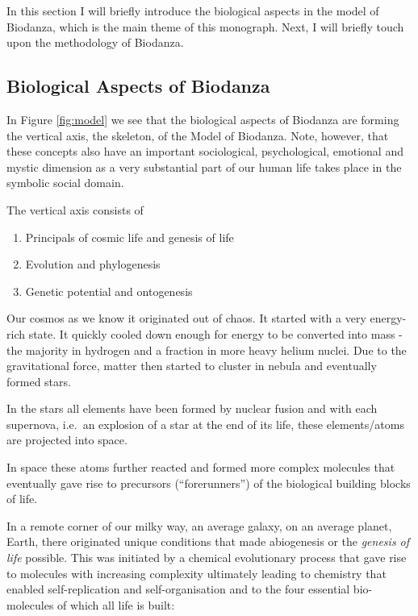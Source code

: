 \documentclass[
  11pt,
]{book}
\providecommand{\tightlist}{%
  \setlength{\itemsep}{0pt}\setlength{\parskip}{0pt}}
\begin{document}
In this section I will briefly introduce the biological aspects in the model of Biodanza, which is the main theme of this monograph. Next, I will briefly touch upon the methodology of Biodanza.

\hypertarget{biological-aspects-of-biodanza}{%
\subsection{Biological Aspects of Biodanza}\label{biological-aspects-of-biodanza}}

In Figure \ref{fig:model} we see that the biological aspects of Biodanza are forming the vertical axis, the skeleton, of the Model of Biodanza. Note, however, that these concepts also have an important sociological, psychological, emotional and mystic dimension as a very substantial part of our human life takes place in the symbolic social domain.

The vertical axis consists of

\begin{enumerate}
\def\labelenumi{\arabic{enumi}.}
\tightlist
\item
  Principals of cosmic life and genesis of life
\item
  Evolution and phylogenesis
\item
  Genetic potential and ontogenesis
\end{enumerate}

Our cosmos as we know it originated out of chaos. It started with a very energy-rich state. It quickly cooled down enough for energy to be converted into mass - the majority in hydrogen and a fraction in more heavy helium nuclei. Due to the gravitational force, matter then started to cluster in nebula and eventually formed stars.

In the stars all elements have been formed by nuclear fusion and with each supernova, i.e.~an explosion of a star at the end of its life, these elements/atoms are projected into space.

In space these atoms further reacted and formed more complex molecules that eventually gave rise to precursors (``forerunners'') of the biological building blocks of life.

In a remote corner of our milky way, an average galaxy, on an average planet, Earth, there originated unique conditions that made abiogenesis or the \emph{genesis of life} possible.
This was initiated by a chemical evolutionary process that gave rise to molecules with increasing complexity ultimately leading to chemistry that enabled self-replication and self-organisation and to the four essential bio-molecules of which all life is built:
\end{document}
